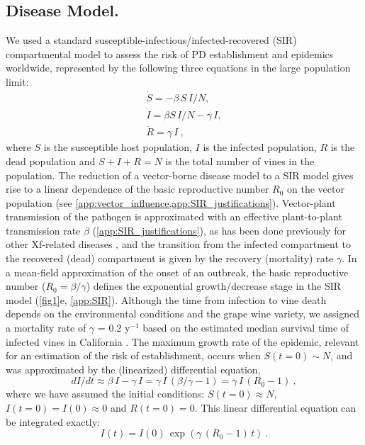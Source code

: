     \subsection{Disease Model.} We used a standard
    susceptible-infectious/infected-recovered (SIR) compartmental model to
    assess
    the risk of PD establishment and epidemics worldwide, represented by the
    following three equations in the large population limit:
    \begin{equation}
        \begin{array}{l}
            \dot{S}=-\beta \, S \, I/N ,         \\
            \dot{I}=\beta S\, I/N - \gamma\,  I, \\
            \dot{R}=\gamma \, I \ ,
        \end{array}
        \label{eq:SIRmodel}
    \end{equation}
    where $S$ is the susceptible host population, $I$ is the infected
    population, $R$ is the dead population and $S+I+R=N$ is the total number of
    vines in the population. The reduction of a vector-borne disease model to a
    SIR
    model gives rise to a linear dependence of the basic reproductive number
$R_0$
    on the vector population (see
    \cref{app:vector_influence,app:SIR_justifications}).
    Vector-plant
    transmission of the pathogen is approximated with an effective
    plant-to-plant
    transmission rate $\beta$ (\cref{app:SIR_justifications}), as has been done
    previously for other Xf-related diseases \cite{White2020}, and the
    transition
    from the infected compartment to the recovered (dead) compartment is given
    by
    the recovery (mortality) rate $\gamma$.  In a mean-field approximation of
    the
    onset of an outbreak, the basic reproductive number ($R_0=\beta/\gamma$)
    defines the exponential growth/decrease stage in the SIR model
    (\cref{fig1}e, \cref{app:SIR}). Although the time from infection to vine
    death
    depends on the environmental conditions and the grape wine variety, we
    assigned
    a mortality rate of $\gamma$ = 0.2 y$^{-1}$  based on the estimated median
    survival time of infected vines in California \cite{Almeida2003}. The
    maximum
    growth rate of the epidemic, relevant for an estimation of the risk of
    establishment, occurs when $S(t=0)\sim N$, and was approximated by the
    (linearized) differential equation,
    \begin{equation}
        dI/dt \approx \beta \, I-\gamma \, I = \gamma\,  I\, (\beta/\gamma -
        1)=\gamma \, I\, (R_0-1) \ ,
    \end{equation}
    where we have assumed the initial conditions:
$S(t= 0)\approx N$, $I(t = 0)= I(0) \approx0$ and $R(t = 0)=0$. This linear
    differential equation can be integrated exactly:
    \begin{equation}\label{eq:infect_proc}
        I(t)=I(0)\, \exp(\gamma\, (R_0-1)\, t) \ .
    \end{equation}

